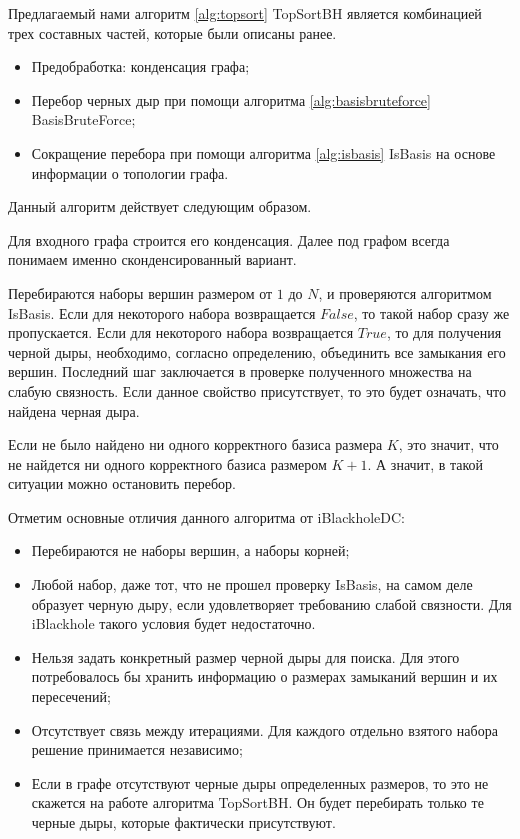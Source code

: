 \documentclass[12pt,a4paper,oneside,openany]{article}
\theoremstyle{definition}
\theoremstyle{lemma}
\theoremstyle{remark}
\begin{document}
Предлагаемый нами алгоритм \ref{alg:topsort} TopSortBH является комбинацией трех составных частей, которые были описаны ранее.
    \begin{itemize}
        \item Предобработка: конденсация графа;
        \item Перебор черных дыр при помощи алгоритма \ref{alg:basisbruteforce} BasisBruteForce;
        \item Сокращение перебора при помощи алгоритма \ref{alg:isbasis} IsBasis на основе информации о топологии графа.
    \end{itemize}

Данный алгоритм действует следующим образом.

Для входного графа строится его конденсация.
Далее под графом всегда понимаем именно сконденсированный вариант.

Перебираются наборы вершин размером от $1$ до $N$, и проверяются алгоритмом IsBasis.
Если для некоторого набора возвращается $False$, то такой набор сразу же пропускается.
Если для некоторого набора возвращается $True$, то для получения черной дыры,
необходимо, согласно определению, объединить все замыкания его вершин.
Последний шаг заключается в проверке полученного множества на слабую связность.
Если данное свойство присутствует, то это будет означать, что найдена черная дыра.

Если не было найдено ни одного корректного базиса размера $K$, это значит, что
не найдется ни одного корректного базиса размером $K + 1$. А значит, в такой ситуации
можно остановить перебор.

Отметим основные отличия данного алгоритма от iBlackholeDC:
    \begin{itemize}
        \item Перебираются не наборы вершин, а наборы корней;
        \item Любой набор, даже тот, что не прошел проверку IsBasis, на самом деле образует черную дыру, если удовлетворяет требованию слабой связности.  Для iBlackhole такого условия будет недостаточно.
        \item Нельзя задать конкретный размер черной дыры для поиска. Для этого потребовалось бы хранить информацию о размерах замыканий вершин и их пересечений;
        \item Отсутствует связь между итерациями. Для каждого отдельно взятого набора решение принимается независимо;
        \item Если в графе отсутствуют черные дыры определенных размеров, то это не скажется на работе алгоритма TopSortBH. Он будет перебирать только те черные дыры, которые фактически присутствуют.
    \end{itemize}
\end{document}
